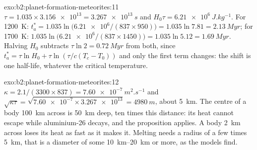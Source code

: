 \begin{solution}{exo:b2:planet-formation-meteorites:11}
$\tau = 1.035\times\num{3.156e13} = \qty{3.267e13}{s}$ and
$H_0\tau = \qty{6.21e6}{J.kg^{-1}}$. For \qty{1200}{K}:
$t_a^* = 1.035\ln\bigl(\num{6.21e6}/(837\times950)\bigr) = 1.035\ln7.81 =
\qty{2.13}{Myr}$; for \qty{1700}{K}: $1.035\ln\bigl(\num{6.21e6}/(837\times1450)\bigr)
= 1.035\ln5.12 = \qty{1.69}{Myr}$. Halving $H_0$ subtracts $\tau\ln2 =
\qty{0.72}{Myr}$ from both, since $t_a^* = \tau\ln H_0 + \tau\ln(\tau/c(T_c -
T_0))$ and only the first term changes: the shift is one half-life, whatever the
critical temperature.
\end{solution}

\begin{solution}{exo:b2:planet-formation-meteorites:12}
$\kappa = 2.1/(3300\times837) = \qty{7.60e-7}{m^2.s^{-1}}$ and
$\sqrt{\kappa\tau} = \sqrt{\num{7.60e-7}\times\num{3.267e13}} = \qty{4980}{m}$,
about \qty{5}{km}. The centre of a body \qty{100}{km} across is \qty{50}{km} deep,
ten times this distance: its heat cannot escape while aluminium-26 decays, and the
proposition applies. A body \qty{2}{km} across loses its heat as fast as it makes
it. Melting needs a radius of a few times \qty{5}{km}, that is a diameter of some
\qtyrange{10}{20}{km} or more, as the models find.
\end{solution}

